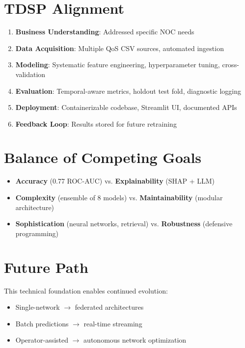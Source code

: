 \documentclass[11pt,a4paper,oneside]{report}
\begin{document}
\section{TDSP Alignment}

\begin{enumerate}
    \item \textbf{Business Understanding}: Addressed specific NOC needs
    \item \textbf{Data Acquisition}: Multiple QoS CSV sources, automated ingestion
    \item \textbf{Modeling}: Systematic feature engineering, hyperparameter tuning, cross-validation
    \item \textbf{Evaluation}: Temporal-aware metrics, holdout test fold, diagnostic logging
    \item \textbf{Deployment}: Containerizable codebase, Streamlit UI, documented APIs
    \item \textbf{Feedback Loop}: Results stored for future retraining
\end{enumerate}

\section{Balance of Competing Goals}

\begin{itemize}
    \item \textbf{Accuracy} (0.77 ROC-AUC) vs. \textbf{Explainability} (SHAP + LLM)
    \item \textbf{Complexity} (ensemble of 8 models) vs. \textbf{Maintainability} (modular architecture)
    \item \textbf{Sophistication} (neural networks, retrieval) vs. \textbf{Robustness} (defensive programming)
\end{itemize}

\section{Future Path}

This technical foundation enables continued evolution:
\begin{itemize}
    \item Single-network $\rightarrow$ federated architectures
    \item Batch predictions $\rightarrow$ real-time streaming
    \item Operator-assisted $\rightarrow$ autonomous network optimization
\end{itemize}
\end{document}
